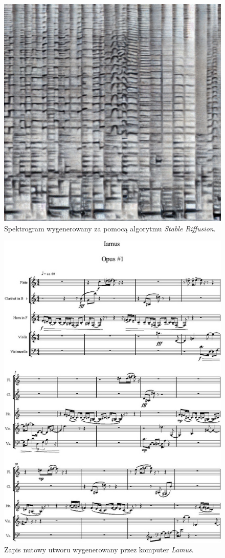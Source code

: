 \documentclass[]{beamer}
\begin{document}
\begin{frame}
  \begin{multicols}{2}
  \begin{figure}
    \includegraphics[width=0.8\linewidth]{riffusion_spectro.jpg}
    \caption{Spektrogram wygenerowany za pomocą algorytmu \textit{Stable Riffusion}.}
  \end{figure}
  \begin{figure}
    \includegraphics[width=0.6\linewidth]{lamus_notes.jpg}
    \caption{Zapis nutowy utworu wygenerowany przez komputer \textit{Lamus}.}
  \end{figure}

  \end{multicols}

\end{frame}
\end{document}
